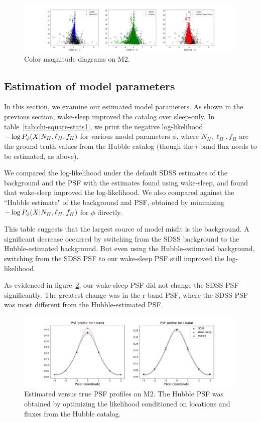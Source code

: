 \begin{figure}[h]
    \centering
    \includegraphics[width=0.99\textwidth]{figures/cmd.png}
    \caption{Color magnitude diagrams on M2. }
    \label{fig:cmd_m2}
\end{figure}


\subsection{Estimation of model parameters}
In this section, we examine our estimated model parameters. As shown in the previous section, wake-sleep improved the catalog over sleep-only. In table~\ref{tab:chi-square-stats1}, we
print the negative log-likelihood $- \log P_\phi(X | N_{H}, \ell_{H}, f_{H})$ for various model parameters $\phi$, where $N_{H}, \ell_{H}, f_{H}$ are the ground truth
values from the Hubble catalog (though the $i$-band flux needs to be estimated, as above). 

We compared the log-likelihood under the default SDSS estimates of the background and the PSF with the estimates found using wake-sleep, and found that wake-sleep improved the log-likelihood. We also compared against the ``Hubble estimate" of the background and PSF, obtained by minimizing 
$- \log P_\phi(X | N_{H}, \ell_{H}, f_{H})$ for $\phi$ directly. 

This table suggests that the largest source of model misfit is the background. A significant decrease occurred by switching from the SDSS background to the Hubble-estimated background. 
But even using the Hubble-estimated background, switching from the SDSS PSF to our wake-sleep PSF still improved the log-likelihood. 



As evidenced in figure~\ref{fig:psf_profiles}, our wake-sleep PSF did not change the SDSS PSF significantly. The greatest change was in the r-band PSF, where the SDSS PSF was most different from the Hubble-estimated PSF. 

\begin{figure}[h]
    \centering
    \includegraphics[width=0.99\textwidth]{figures/psf_profiles.png}
    \caption{Estimated versus true PSF profiles on M2. The Hubble PSF was
    obtained by optimizing the likelihood conditioned on locations and fluxes
    from the Hubble catalog. }
    \label{fig:psf_profiles}
\end{figure}


